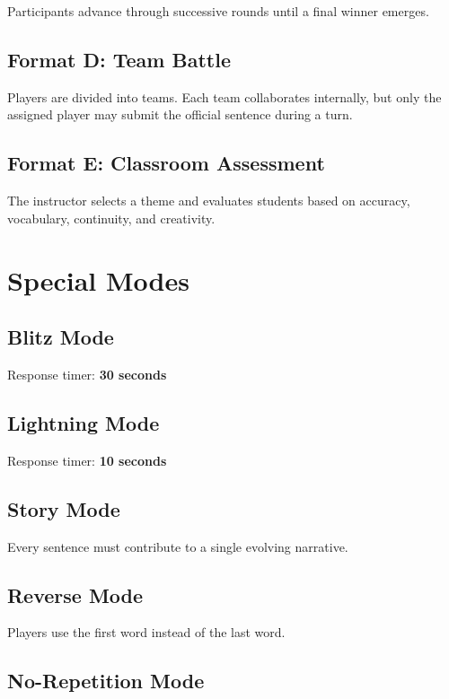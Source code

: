 \documentclass[11pt,a4paper]{article}
\begin{document}
Participants advance through successive rounds until a final winner emerges.

\subsection{Format D: Team Battle}

Players are divided into teams. Each team collaborates internally, but only the assigned player may submit the official sentence during a turn.

\subsection{Format E: Classroom Assessment}

The instructor selects a theme and evaluates students based on accuracy, vocabulary, continuity, and creativity.

\section{Special Modes}

\subsection{Blitz Mode}

Response timer: \textbf{30 seconds}

\subsection{Lightning Mode}

Response timer: \textbf{10 seconds}

\subsection{Story Mode}

Every sentence must contribute to a single evolving narrative.

\subsection{Reverse Mode}

Players use the first word instead of the last word.

\subsection{No-Repetition Mode}
\end{document}

